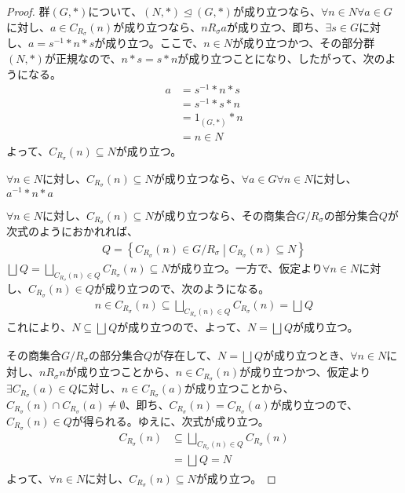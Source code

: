 \documentclass[dvipdfmx]{jsarticle}
\begin{document}
\begin{proof}
群$(G,*)$について、$(N,*) \trianglelefteq (G,*)$が成り立つなら、$\forall n \in N\forall a \in G$に対し、$a \in C_{R_{\sigma}}(n)$が成り立つなら、$nR_{\sigma}a$が成り立つ、即ち、$\exists s \in G$に対し、$a = s^{- 1}*n*s$が成り立つ。ここで、$n \in N$が成り立つかつ、その部分群$(N,*)$が正規なので、$n*s = s*n$が成り立つことになり、したがって、次のようになる。
\begin{align*}
a &= s^{- 1}*n*s\\
&= s^{- 1}*s*n\\
&= 1_{(G,*)}*n\\
&= n \in N
\end{align*}
よって、$C_{R_{\sigma}}(n) \subseteq N$が成り立つ。\par
$\forall n \in N$に対し、$C_{R_{\sigma}}(n) \subseteq N$が成り立つなら、$\forall a \in G\forall n \in N$に対し、$a^{- 1}*n*a$\par
$\forall n \in N$に対し、$C_{R_{\sigma}}(n) \subseteq N$が成り立つなら、その商集合${G}/{R_{\sigma}}$の部分集合$Q$が次式のようにおかれれば、
\begin{align*}
Q = \left\{ C_{R_{\sigma}}(n) \in {G}/{R_{\sigma}} \middle| C_{R_{\sigma}}(n) \subseteq N \right\}
\end{align*}
$\bigsqcup_{} Q = \bigsqcup_{C_{R_{\sigma}}(n) \in Q} {C_{R_{\sigma}}(n)} \subseteq N$が成り立つ。一方で、仮定より$\forall n \in N$に対し、$C_{R_{\sigma}}(n) \in Q$が成り立つので、次のようになる。
\begin{align*}
n \in C_{R_{\sigma}}(n) \subseteq \bigsqcup_{C_{R_{\sigma}}(n) \in Q} {C_{R_{\sigma}}(n)} = \bigsqcup_{} Q
\end{align*}
これにより、$N \subseteq \bigsqcup_{} Q$が成り立つので、よって、$N = \bigsqcup_{} Q$が成り立つ。\par
その商集合${G}/{R_{\sigma}}$の部分集合$Q$が存在して、$N = \bigsqcup_{} Q$が成り立つとき、$\forall n \in N$に対し、$nR_{\sigma}n$が成り立つことから、$n \in C_{R_{\sigma}}(n)$が成り立つかつ、仮定より$\exists C_{R_{\sigma}}(a) \in Q$に対し、$n \in C_{R_{\sigma}}(a)$が成り立つことから、$C_{R_{\sigma}}(n) \cap C_{R_{\sigma}}(a) \neq \emptyset$、即ち、$C_{R_{\sigma}}(n) = C_{R_{\sigma}}(a)$が成り立つので、$C_{R_{\sigma}}(n) \in Q$が得られる。ゆえに、次式が成り立つ。
\begin{align*}
C_{R_{\sigma}}(n) &\subseteq \bigsqcup_{C_{R_{\sigma}}(n) \in Q} {C_{R_{\sigma}}(n)}\\
&= \bigsqcup_{} Q = N
\end{align*}
よって、$\forall n \in N$に対し、$C_{R_{\sigma}}(n) \subseteq N$が成り立つ。\par

\end{proof}
\end{document}
